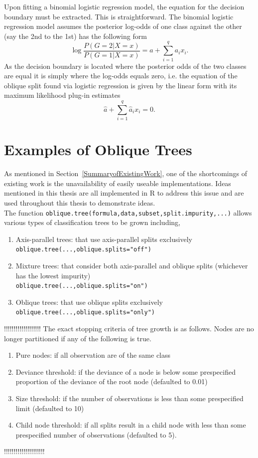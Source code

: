 Upon fitting a binomial logistic regression model, the equation for the decision boundary must be extracted. This is straightforward. The binomial logistic regression model assumes the posterior log-odds of one class against the other (say the 2nd to the 1st) has the following form $$\log\frac{P(G=2|X=x)}{P(G=1|X=x)}=a+\sum_{i=1}^q a_i x_i.$$ As the decision boundary is located where the posterior odds of the two classes are equal it is simply where the log-odds equals zero, i.e. the equation of the oblique split found via logistic regression is given by the linear form with its maximum likelihood plug-in estimates $$\hat{a}+\sum_{i=1}^q \hat{a}_i x_i=0.$$ 

\section{Examples of Oblique Trees}
\label{ExamplesofObliqueTrees}
As mentioned in Section~\ref{SummaryofExistingWork}, one of the shortcomings of existing work is the unavailability of easily useable implementations. Ideas mentioned in this thesis are all implemented in R to address this issue and are used throughout this thesis to demonstrate ideas. \\

The function \texttt{oblique.tree(formula,data,subset,split.impurity,...)} allows various types of classification trees to be grown including,
\begin{enumerate}
\item Axis-parallel trees: that use axis-parallel splits exclusively\\
\texttt{oblique.tree(...,oblique.splits="off")}
\item Mixture trees: that consider both axis-parallel and oblique splits (whichever has the lowest impurity)\\
\texttt{oblique.tree(...,oblique.splits="on")}
\item Oblique trees: that use oblique splits exclusively\\
\texttt{oblique.tree(...,oblique.splits="only")}
\end{enumerate}
!!!!!!!!!!!!!!!!!!!
The exact stopping criteria of tree growth is as follows. Nodes are no longer partitioned if any of the following is true.
\begin{enumerate}
\item Pure nodes: if all observation are of the same class
\item Deviance threshold: if the deviance of a node is below some prespecified proportion of the deviance of the root node (defaulted to 0.01)
\item Size threshold: if the number of observations is less than some prespecified limit (defaulted to 10)
\item Child node threshold: if all splits result in a child node with less than some prespecified number of observations (defaulted to 5).
\end{enumerate}
!!!!!!!!!!!!!!!!!!!!!

